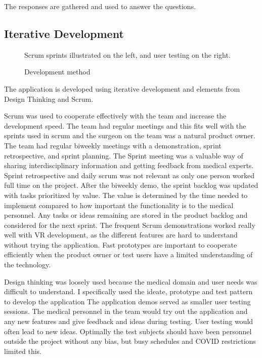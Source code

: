 \documentclass[a4paper]{report}
\begin{document}
The responses are gathered and used to answer the questions.

\subsection{Iterative Development}
\begin{figure}[h!]
    \centering
	\hfill
  \caption{Development method}
  \small
  Scrum sprints illustrated on the left, and user testing on the right.
\end{figure}

The application is developed using iterative development and elements from Design Thinking and Scrum.

Scrum was used to cooperate effectively with the team and increase the development speed. The team had regular meetings and this fits well with the sprints used in scrum and the surgeon on the team was a natural product owner.
The team had regular biweekly meetings with a demonstration, sprint retrospective, and sprint planning. The Sprint meeting was a valuable way of sharing interdisciplinary information and getting feedback from medical experts. Sprint retrospective and daily scrum was not relevant as only one person worked full time on the project.
After the biweekly demo, the sprint backlog was updated with tasks prioritized by value. The value is determined by the time needed to implement compared to how important the functionality is to the medical personnel. Any tasks or ideas remaining are stored in the product backlog and considered for the next sprint.
The frequent Scrum demonstrations worked really well with VR development, as the different features are hard to understand without trying the application. Fast prototypes are important to cooperate efficiently when the product owner or test users have a limited understanding of the technology.

Design thinking was loosely used because the medical domain and user needs was difficult to understand. I specifically used the ideate, prototype and test pattern to develop the application
The application demos served as smaller user testing sessions. The medical personnel in the team would try out the application and any new features and give feedback and ideas during testing. User testing would often lead to new ideas. Optimally the test subjects should have been personnel outside the project without any bias, but busy schedules and COVID restrictions limited this.
\end{document}
